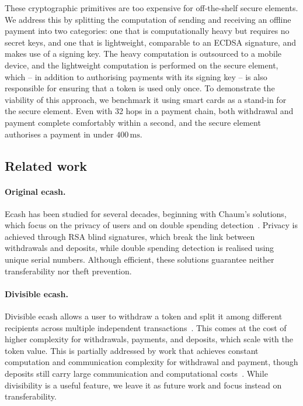 These cryptographic primitives are too expensive for off-the-shelf secure
elements. We address this by splitting the computation of sending and
receiving an offline payment into two categories: one that is
computationally heavy but requires no secret keys, and one that is
lightweight, comparable to an ECDSA signature, and makes use of a
signing key. The heavy computation is outsourced to a mobile device, and the
lightweight computation is performed on the secure element, which -- in
addition to authorising payments with its signing key -- is also responsible
for ensuring that a token is used only once. To demonstrate the viability of
this approach, we benchmark it using smart cards as a stand-in for the secure
element. Even with 32 hops in a payment chain, both withdrawal and payment
complete comfortably within a second, and the secure element authorises a
payment in under $400\,\mathrm{ms}$.

\subsection{Related work}\label{sec:offline-related}

\paragraph{Original ecash.} Ecash has been studied for several decades,
beginning with Chaum's solutions, which focus on the
privacy of users and on double spending detection~\cite{C:Chaum82,C:ChaFiaNao88}. Privacy is achieved through
RSA blind signatures, which break the link between withdrawals and deposits,
while double spending detection is realised using unique serial numbers.
Although efficient, these solutions guarantee neither transferability nor
theft prevention.

\paragraph{Divisible ecash.} Divisible ecash allows a user to withdraw a
token and split it among different recipients across multiple independent
transactions~\cite{C:OkaOht91,C:Okamoto95}. This comes at the cost of higher
complexity for withdrawals, payments, and deposits, which scale with the token
value. This is partially addressed by work that achieves constant computation
and communication complexity for withdrawal and payment, though deposits
still carry large communication and computational
costs~\cite{PKC:CPST15,ACNS:CPST15}. While divisibility is a useful feature, we leave it as
future work and focus instead on transferability.

